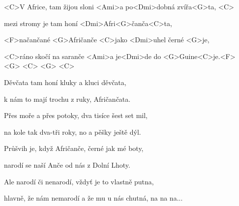 
\zs

<C>V Africe, tam žijou sloni <Ami>a po<Dmi>dobná 
zvířa<G>ta, <C>


mezi stromy je tam honí <Dmi>Afri<G>čanča<C>ta,


<F>načančané <G>Afričanče <C>jako <Dmi>uhel černé 
<G>je,


<C>ráno skočí na saranče <Ami>a je<Dmi>de do <G>Guine<C>je.<F> <G> <C> <G> <C> 

\ks
\zs

Děvčata tam honí kluky a kluci děvčata,

k nám to mají trochu z ruky, Afričančata.

Přes moře a přes potoky, dva tisíce šest set mil,

na kole tak dva-tři roky, no a pěšky ještě dýl.

\ks
\zs

Průšvih je, když Afričanče, černé jak mé boty,

narodí se naší Anče od nás z Dolní Lhoty.

Ale narodí či nenarodí, vždyť je to vlastně putna,

hlavně, že nám nemarodí a že mu u nás chutná, na na na...

\ks

\kp






